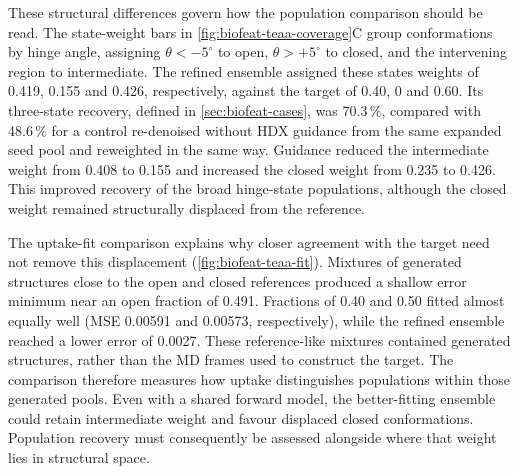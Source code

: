 These structural differences govern how the population comparison should be read. The state-weight bars in \cref{fig:biofeat-teaa-coverage}C group conformations by hinge angle, assigning $\theta<-5^\circ$ to open, $\theta>+5^\circ$ to closed, and the intervening region to intermediate. The refined ensemble assigned these states weights of 0.419, 0.155 and 0.426, respectively, against the target of 0.40, 0 and 0.60. Its three-state recovery, defined in \cref{sec:biofeat-cases}, was 70.3\,\%, compared with 48.6\,\% for a control re-denoised without HDX guidance from the same expanded seed pool and reweighted in the same way. Guidance reduced the intermediate weight from 0.408 to 0.155 and increased the closed weight from 0.235 to 0.426. This improved recovery of the broad hinge-state populations, although the closed weight remained structurally displaced from the reference.

The uptake-fit comparison explains why closer agreement with the target need not remove this displacement (\cref{fig:biofeat-teaa-fit}). Mixtures of generated structures close to the open and closed references produced a shallow error minimum near an open fraction of 0.491. Fractions of 0.40 and 0.50 fitted almost equally well (MSE 0.00591 and 0.00573, respectively), while the refined ensemble reached a lower error of 0.0027. These reference-like mixtures contained generated structures, rather than the MD frames used to construct the target. The comparison therefore measures how uptake distinguishes populations within those generated pools. Even with a shared forward model, the better-fitting ensemble could retain intermediate weight and favour displaced closed conformations. Population recovery must consequently be assessed alongside where that weight lies in structural space.

